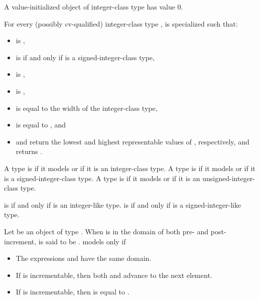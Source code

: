 \pnum
A value-initialized object of integer-class type has value 0.

\pnum
For every (possibly cv-qualified) integer-class type ,
 is specialized such that:
\begin{itemize}
\item
   is ,
\item
   is 
  if and only if  is a signed-integer-class type,
\item
   is ,
\item
   is ,
\item
   is equal to the width of the integer-class type,
\item
   is equal to , and
\item
   and  return
  the lowest and highest representable values of , respectively, and
   returns .
\end{itemize}

\pnum
A type  is 
if it models  or
if it is an integer-class type.
A type  is 
if it models  or
if it is a signed-integer-class type.
A type  is 
if it models  or
if it is an unsigned-integer-class type.

\pnum
{} is 
if and only if  is an integer-like type.
 is 
if and only if  is a signed-integer-like type.

\pnum
Let  be an object of type . When  is in the domain of
both pre- and post-increment,  is said to be .
 models  only if
\begin{itemize}
\item The expressions  and  have the same domain.
\item If  is incrementable, then both 
  and  advance  to the next element.
\item If  is incrementable, then
   is equal to
  .
\end{itemize}

